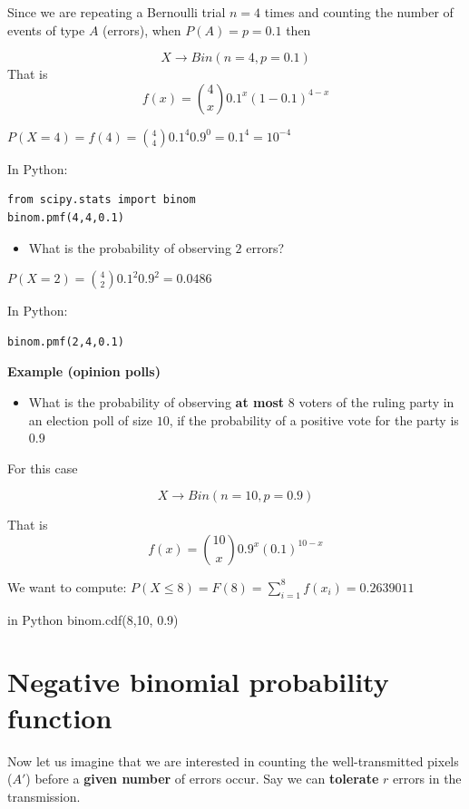\documentclass[
]{book}
\providecommand{\tightlist}{%
  \setlength{\itemsep}{0pt}\setlength{\parskip}{0pt}}
\begin{document}
Since we are repeating a Bernoulli trial \(n=4\) times and counting the number of events of type \(A\) (errors), when \(P(A)=p=0.1\) then

\[X \rightarrow Bin(n=4, p=0.1)\]
That is \[f(x)=\binom 4 x 0.1^x(1-0.1)^{4-x}\]

\(P(X=4)=f(4)=\binom 4 4 0.1^4 0.9^{0}=0.1^4=10^{-4}\)

In Python:

\begin{verbatim}
from scipy.stats import binom
binom.pmf(4,4,0.1)
\end{verbatim}

\begin{itemize}
\tightlist
\item
  What is the probability of observing \(2\) errors?
\end{itemize}

\(P(X=2)=\binom 4 2 0.1^2 0.9^2=0.0486\)

In Python:

\begin{verbatim}
binom.pmf(2,4,0.1)
\end{verbatim}

\textbf{Example (opinion polls)}

\begin{itemize}
\tightlist
\item
  What is the probability of observing \textbf{at most} \(8\) voters of the ruling party in an election poll of size \(10\), if the probability of a positive vote for the party is \(0.9\)
\end{itemize}

For this case

\[X \rightarrow Bin(n=10, p=0.9)\]

That is \[f(x)=\binom {10} x 0.9^x(0.1)^{10-x}\]

We want to compute:
\(P(X\le 8)=F(8)= \sum_{i=1}^8 f(x_i)=0.2639011\)

in Python binom.cdf(8,10, 0.9)

\hypertarget{negative-binomial-probability-function}{%
\section{Negative binomial probability function}\label{negative-binomial-probability-function}}

Now let us imagine that we are interested in counting the well-transmitted pixels (\(A'\)) before a \textbf{given number} of errors occur. Say we can \textbf{tolerate} \(r\) errors in the transmission.
\end{document}
